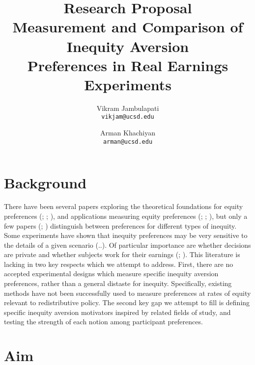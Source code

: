 \documentclass[12pt, a4paper]{article}
\title{Research Proposal\\
       \large Measurement and Comparison of Inequity Aversion \\ Preferences in Real Earnings Experiments}
\author{
  Vikram Jambulapati\\
  \texttt{vikjam@ucsd.edu}
  \and
  Arman Khachiyan\\
  \texttt{arman@ucsd.edu}
}
\date{}
\begin{document}
\maketitle

\section*{Background}
There have been several papers exploring the theoretical foundations for equity preferences (\citealp{Andreoni_EJ1990}; \citealp{Fehr_Schmidt_HB2006}; \citealp{Rabin_AER1993}), and applications measuring equity preferences (\citealp{Erkal_Gangadharan_Nikiforakis_AER2011}; \citealp{Akbas_Ariely_Yuksel_2016}; \citealp{Gee_Migueis_Parsa_EE2017}), but only a few papers (\citealp{Cappelen_Hole_Sorensen_AER2007}; \citealp{Saito_AER2013}) distinguish between preferences for different types of inequity. Some experiments have shown that inequity preferences may be very sensitive to the details of a given scenario (..). Of particular importance are whether decisions are private and whether subjects work for their earnings (\citealp{Cherry_Frykblom_Shogren}; \citealp{Carlsson_He_Martinsson_EE2013}). This literature is lacking in two key respects which we attempt to address. First, there are no accepted experimental designs which measure specific inequity aversion preferences, rather than a general distaste for inequity. Specifically, existing methods have not been successfully used to measure preferences at rates of equity relevant to redistributive policy. The second key gap we attempt to fill is defining specific inequity aversion motivators inspired by related fields of study, and testing the strength of each notion among participant preferences. 
% 
% 
% 
%
% 
% 
% 
%

\section*{Aim}
\end{document}
